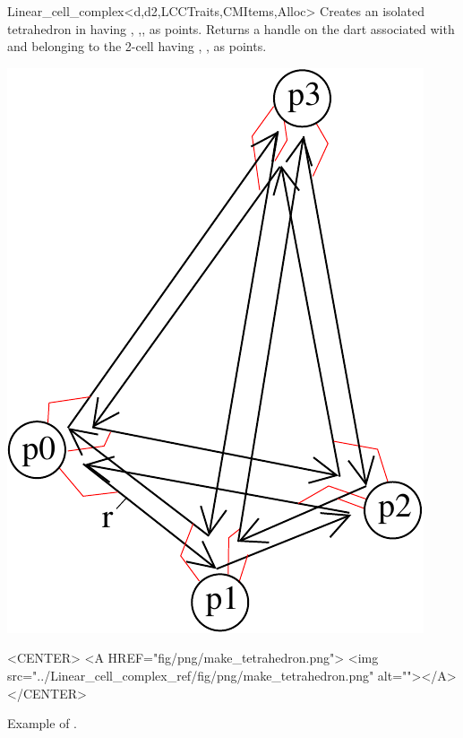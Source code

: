 \begin{ccRefClass}{Linear_cell_complex<d,d2,LCCTraits,CMItems,Alloc>}
{Creates an isolated tetrahedron in  having ,
  ,, as points.  Returns a handle on the dart
  associated with  and belonging to the 2-cell having
  , ,  as points.
    }
%
\def\LargFig{.3\textwidth}
  \begin{ccTexOnly}
    \begin{center}
      \includegraphics[width=\LargFig]{Linear_cell_complex_ref/fig/pdf/make_tetrahedron}
    \end{center}
  \end{ccTexOnly}
  \begin{ccHtmlOnly}
    <CENTER>
    <A HREF="fig/png/make_tetrahedron.png">
        <img src="../Linear_cell_complex_ref/fig/png/make_tetrahedron.png" alt=""></A>
    </CENTER>
    \end{ccHtmlOnly}
    \centerline{Example of .}


\end{ccRefClass}
